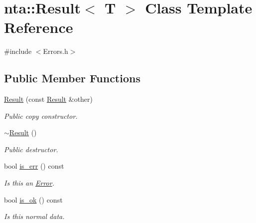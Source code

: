 \hypertarget{classnta_1_1Result}{}\section{nta\+:\+:Result$<$ T $>$ Class Template Reference}
\label{classnta_1_1Result}


{\ttfamily \#include $<$Errors.\+h$>$}

\subsection*{Public Member Functions}
\begin{DoxyCompactItemize}
\item 
\mbox{\label{classnta_1_1Result_a2410d4b139bc036b9ff6d30ab5e15f8d}} 
\hyperlink{classnta_1_1Result_a2410d4b139bc036b9ff6d30ab5e15f8d}{Result} (const \hyperlink{classnta_1_1Result}{Result} \&other)
\begin{DoxyCompactList}\small\item\em Public copy constructor. \end{DoxyCompactList}\item 
\mbox{\label{classnta_1_1Result_a5fd9525155666ef2eaf605d82d13bd77}} 
\hyperlink{classnta_1_1Result_a5fd9525155666ef2eaf605d82d13bd77}{$\sim$\+Result} ()
\begin{DoxyCompactList}\small\item\em Public destructor. \end{DoxyCompactList}\item 
\mbox{\label{classnta_1_1Result_ab742b047f1e670bc6a374f32c3fd48ea}} 
bool \hyperlink{classnta_1_1Result_ab742b047f1e670bc6a374f32c3fd48ea}{is\+\_\+err} () const
\begin{DoxyCompactList}\small\item\em Is this an \hyperlink{structnta_1_1Error}{Error}. \end{DoxyCompactList}\item 
\mbox{\label{classnta_1_1Result_a61deaa087694eae4fdaece2996fedda0}} 
bool \hyperlink{classnta_1_1Result_a61deaa087694eae4fdaece2996fedda0}{is\+\_\+ok} () const
\begin{DoxyCompactList}\small\item\em Is this normal data. \end{DoxyCompactList}\item 

\end{DoxyCompactItemize}
